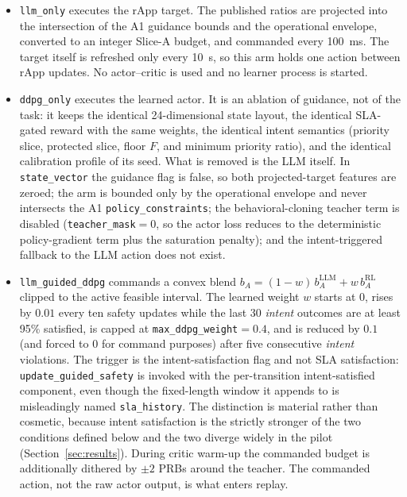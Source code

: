 \begin{itemize}
  \item \texttt{llm\_only} executes the rApp target. The published ratios are projected into
  the intersection of the A1 guidance bounds and the operational envelope, converted to an
  integer Slice-A budget, and commanded every 100~ms. The target itself is refreshed only
  every 10~s, so this arm holds one action between rApp updates. No actor--critic is used and
  no learner process is started.
  \item \texttt{ddpg\_only} executes the learned actor. It is an ablation of guidance, not of
  the task: it keeps the identical 24-dimensional state layout, the identical SLA-gated
  reward with the same weights, the identical intent semantics (priority slice, protected
  slice, floor $F$, and minimum priority ratio), and the identical calibration profile of its
  seed. What is removed is the LLM itself. In \texttt{state\_vector} the guidance flag is
  false, so both projected-target features are zeroed; the arm is bounded only by the
  operational envelope and never intersects the A1 \texttt{policy\_constraints}; the
  behavioral-cloning teacher term is disabled (\texttt{teacher\_mask}${}=0$, so the actor loss
  reduces to the deterministic policy-gradient term plus the saturation penalty); and the
  intent-triggered fallback to the LLM action does not exist.
  \item \texttt{llm\_guided\_ddpg} commands a convex blend
  $b_A=(1-w)\,b_A^{\mathrm{LLM}}+w\,b_A^{\mathrm{RL}}$ clipped to the active feasible
  interval. The learned weight $w$ starts at $0$, rises by $0.01$ every ten safety updates
  while the last 30 \emph{intent} outcomes are at least 95\% satisfied, is capped at
  \texttt{max\_ddpg\_weight}${}=0.4$, and is reduced by $0.1$ (and forced to $0$ for command
  purposes) after five consecutive \emph{intent} violations. The trigger is the
  intent-satisfaction flag and not SLA satisfaction: \texttt{update\_guided\_safety} is
  invoked with the per-transition intent-satisfied component, even though the fixed-length
  window it appends to is misleadingly named \texttt{sla\_history}. The distinction is
  material rather than cosmetic, because intent satisfaction is the strictly stronger of the
  two conditions defined below and the two diverge widely in the pilot
  (Section~\ref{sec:results}). During critic warm-up the commanded budget is additionally
  dithered by $\pm2$ PRBs around the teacher. The commanded action, not the raw actor output,
  is what enters replay.
\end{itemize}

